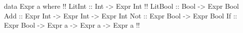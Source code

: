 \begin{code}
data Expr a where  !!
  LitInt  :: Int -> Expr Int  !!
  LitBool :: Bool -> Expr Bool
  Add     :: Expr Int -> Expr Int -> Expr Int
  Not     :: Expr Bool -> Expr Bool
  If      :: Expr Bool -> Expr a -> Expr a -> Expr a  !!
\end{code}
